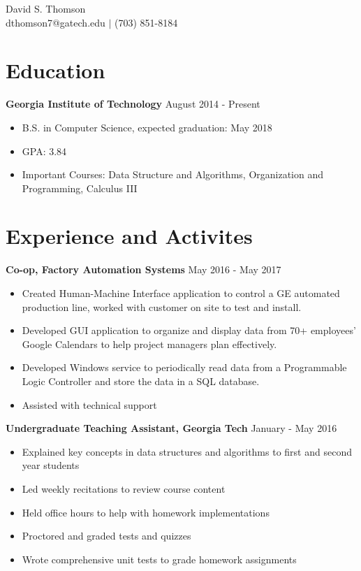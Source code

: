\documentclass[11pt]{article}
\begin{document}
\begin{center}
\vspace*{0.3em}
{\huge David S. Thomson} \\
\vspace*{1em}
dthomson7@gatech.edu $\vert$ (703) 851-8184
\end{center}

\section*{Education}
\textbf{Georgia Institute of Technology} \hfill August 2014 - Present
\begin{itemize}
\setlength\itemsep{0.5pt}
    \item B.S. in Computer Science, expected graduation: May 2018
    \item GPA: 3.84
    \item Important Courses: Data Structure and Algorithms, Organization and Programming, Calculus III %
\end{itemize}

\section*{Experience and Activites}
\textbf{Co-op, Factory Automation Systems} \hfill May 2016 - May 2017
\begin{itemize}
\setlength\itemsep{0.5pt}
    \item Created Human-Machine Interface application to control a GE automated production line, worked with customer on site to test and install.
    \item Developed GUI application to organize and display data from 70+ employees' Google Calendars to help project managers plan effectively.
    \item Developed Windows service to periodically read data from a Programmable Logic Controller and store the data in a SQL database.
    \item Assisted with technical support
\end{itemize}

\textbf{Undergraduate Teaching Assistant, Georgia Tech} \hfill January - May 2016
\begin{itemize}
\setlength\itemsep{0.5pt}
    \item Explained key concepts in data structures and algorithms to first and second year students
    \item Led weekly recitations to review course content
    \item Held office hours to help with homework implementations
    \item Proctored and graded tests and quizzes
    \item Wrote comprehensive unit tests to grade homework assignments
\end{itemize}
\end{document}
